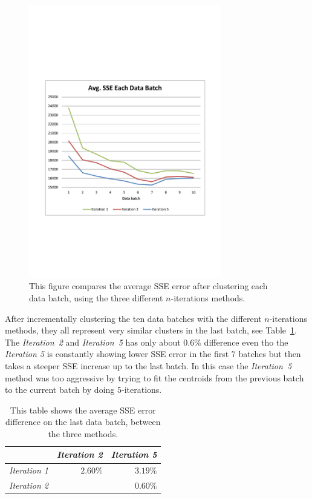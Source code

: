 \begin{figure}[ht]
\centering
\includegraphics[trim = 10mm 70mm 10mm 80mm, clip, width=0.75\textwidth]{Figures/experiments/zdataWO_AvgSSEEachDataBatch.pdf}
\caption{This figure compares the average SSE error after clustering each data batch, using the three different $n$-iterations methods. }
\label{fig:AvgSSEEachDataBatch}
\end{figure}

After incrementally clustering the ten data batches with the different $n$-iterations methods, they all represent very similar clusters in the last batch, see Table~\ref{tab:results_avgSSEeachDataBatch}. The \textit{Iteration~2} and \textit{Iteration~5} has only about $0.6\%$ difference even tho the \textit{Iteration 5} is constantly showing lower SSE error in the first $7$ batches but then takes a steeper SSE increase up to the last batch. In this case the \textit{Iteration~5} method was too aggressive by trying to fit the centroids from the previous batch to the current batch by doing $5$-iterations.

\begin{table}[h]
\centering
\begin{tabular}{| l | r | r |}
    \hline
    & \textit{Iteration 2} & \textit{Iteration 5} \\ \hline
    \textit{Iteration 1} & $2.60\%$ & $3.19\%$  \\ \hline
    \textit{Iteration 2} & & $0.60\%$ \\ \hline
\end{tabular}
\caption{This table shows the average SSE error difference on the last data batch, between the three methods.}
\label{tab:results_avgSSEeachDataBatch}
\end{table}


